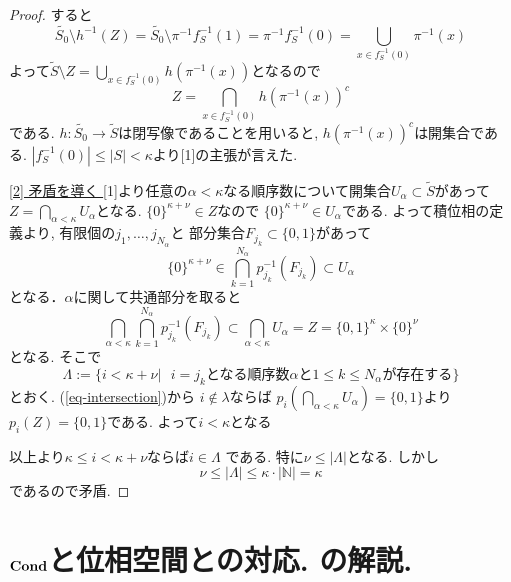 \documentclass[dvipdfmx,a4paper,11pt]{article}
\newcommand{\N}{\mathbb{N}}
\newcommand{\colim}{{\rm colim}}
\theoremstyle{definition}
\begin{document}
\begin{proof}

すると
$$
\widetilde{S_0} \setminus h^{-1}(Z)
=
\widetilde{S_0} \setminus \pi^{-1}f_{S}^{-1}(1)
=
\pi^{-1} f_{S}^{-1}(0)
= \bigcup_{x \in f_{S}^{-1}(0)}  \pi^{-1}(x)
$$
よって$\widetilde{S} \setminus Z =  \bigcup_{x \in f_{S}^{-1}(0)}  h(\pi^{-1}(x))$となるので
$$
Z = \bigcap_{x \in f_{S}^{-1}(0)} h(\pi^{-1}(x))^c
$$
である. 
$h : \widetilde{S_0} \to \widetilde{S}$は閉写像であることを用いると, $h(\pi^{-1}(x))^c$は開集合である. 
$|f_{S}^{-1}(0)|\le |S| < \kappa$より[1]の主張が言えた.

\underline{[2] 矛盾を導く }
[1]より任意の$\alpha < \kappa$なる順序数について開集合$U_{\alpha} \subset \widetilde{S}$があって
$Z = \bigcap_{\alpha < \kappa} U_{\alpha}$となる. 
$\{ 0\}^{\kappa  + \nu} \in Z$なので
$ \{ 0\}^{\kappa  + \nu} \in U_{\alpha}$である.
よって積位相の定義より, 有限個の$j_1, \ldots, j_{N_{\alpha}}$と
部分集合$F_{j_k} \subset \{ 0,1\}$があって
$$
 \{ 0\}^{\kappa  + \nu}  \in 
  \bigcap_{k=1}^{N_{\alpha}} p_{j_k}^{-1}(F_{j_k})
  \subset U_{\alpha}
$$
となる．$\alpha$に関して共通部分を取ると
\begin{equation}
\label{eq-intersection}
 \bigcap_{\alpha <\kappa } \bigcap_{k=1}^{N_{\alpha}} p_{j_k}^{-1}(F_{j_k})
 \subset  \bigcap_{\alpha < \kappa}  U_{\alpha} 
 =Z=\{0,1\}^{\kappa} \times \{ 0\}^{\nu}
 \end{equation}
 となる. 
 そこで
$$
\Lambda := \{  i < \kappa + \nu  |  \text{ $i=j_{k}$となる順序数$\alpha$と$1 \le k \le N_{\alpha}$が存在する} \}
$$
とおく. 
(\ref{eq-intersection})から
$i \not \in \lambda$ならば
$p_{i}( \bigcap_{\alpha <\kappa}  U_{\alpha} ) = \{0,1\}$より
$p_{i}(Z)=\{ 0,1\}$である. 
よって$i < \kappa$となる

以上より$\kappa \le i < \kappa+\nu$ならば$i \in \Lambda$
である. 特に$\nu \le |\Lambda|$となる. 
しかし
$$
\nu \le |\Lambda| \le \kappa \cdot |\N| = \kappa
$$
であるので矛盾.
 \end{proof}






\section{${\bf Cond}$と位相空間との対応. \cite[Proposition 2.15, Theorem 2.16]{Sch19}の解説.}
\end{document}
